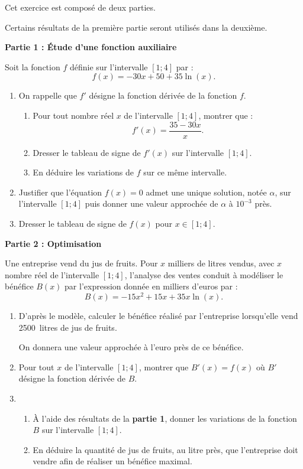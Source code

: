 Cet exercice est composé de deux parties.

\medskip

Certains résultats de la première partie seront utilisés dans la deuxième.

\medskip

\textbf{Partie 1 : Étude d'une fonction auxiliaire}

\medskip

Soit la fonction $f$ définie sur l'intervalle $[1;4]$ par : \[f(x) = - 30x + 50 + 35\ln (x).\]

\begin{enumerate}
	\item On rappelle que $f'$ désigne la fonction dérivée de la fonction $f$.
	\begin{enumerate}
		\item Pour tout nombre réel $x$ de l'intervalle $[1;4]$, montrer que : \[f'(x) = \dfrac{35- 30x}{x}.\]
		\item Dresser le tableau de signe de $f'(x)$ sur l'intervalle $[1;4]$.
		\item En déduire les variations de $f$ sur ce même intervalle.
	\end{enumerate}
	\item Justifier que l'équation $f(x) = 0$ admet une unique solution, notée $\alpha$, sur l'intervalle $[1;4]$ puis donner une valeur approchée de $\alpha$ à $10^{-3}$ près.
	\item  Dresser le tableau de signe de $f(x)$ pour $x \in [1;4]$.
\end{enumerate}

\medskip

\textbf{Partie 2 : Optimisation}

\medskip

Une entreprise vend du jus de fruits. Pour $x$ milliers de litres vendus, avec $x$ nombre réel de l'intervalle $[1;4]$, l'analyse des ventes conduit à modéliser le bénéfice $B(x)$ par l'expression donnée en milliers d'euros par : \[B(x) = - 15x^2 + 15x +35x \ln (x).\]

\begin{enumerate}
	\item D'après le modèle, calculer le bénéfice réalisé par l'entreprise lorsqu'elle vend \num{2500}~litres de jus de fruits.
	
	On donnera une valeur approchée à l'euro près de ce bénéfice.
	\item Pour tout $x$ de l'intervalle $[1;4]$, montrer que $B'(x) = f(x)$ où $B'$ désigne la fonction dérivée de $B$.
	\item 
	\begin{enumerate}
		\item À l'aide des résultats de la \textbf{partie 1}, donner les variations de la fonction $B$ sur l'intervalle $[1;4]$.
		\item En déduire la quantité de jus de fruits, au litre près, que l'entreprise doit vendre afin de réaliser un bénéfice maximal.
	\end{enumerate}
\end{enumerate}
